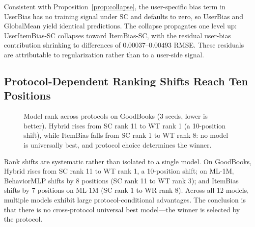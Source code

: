 \documentclass[journal]{IEEEtran}
\begin{document}
Consistent with Proposition~\ref{prop:collapse}, the user-specific bias term in UserBias has no training signal under SC and defaults to zero, so UserBias and GlobalMean yield identical predictions. The collapse propagates one level up: UserItemBias-SC collapses toward ItemBias-SC, with the residual user-bias contribution shrinking to differences of $0.00037$--$0.00493$ RMSE. These residuals are attributable to regularization rather than to a user-side signal.

\subsection{Protocol-Dependent Ranking Shifts Reach Ten Positions}
\label{sec:reversal}

\begin{figure}[!t]
\centering
{}
\caption{Model rank across protocols on GoodBooks (3 seeds, lower is better). Hybrid rises from SC rank 11 to WT rank 1 (a 10-position shift), while ItemBias falls from SC rank 1 to WT rank 8: no model is universally best, and protocol choice determines the winner.}
\label{fig:reversal}
\end{figure}

Rank shifts are systematic rather than isolated to a single model. On GoodBooks, Hybrid rises from SC rank 11 to WT rank 1, a 10-position shift; on ML-1M, BehaviorMLP shifts by 8 positions (SC rank 11 to WT rank 3); and ItemBias shifts by 7 positions on ML-1M (SC rank 1 to WR rank 8). Across all 12 models, multiple models exhibit large protocol-conditional advantages. The conclusion is that there is no cross-protocol universal best model---the winner is selected by the protocol.
\end{document}
